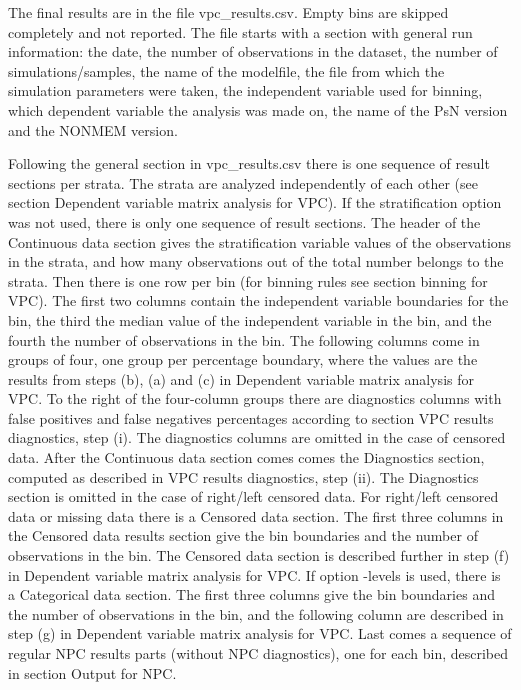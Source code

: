 The final results are in the file vpc\_results.csv. Empty bins are skipped completely and not reported. The file starts with a section with general run information: the date, the number of observations in the dataset, the number of simulations/samples, the name of the modelfile, the file from which the simulation parameters were taken, the independent variable used for binning, which dependent variable the analysis was made on, the name of the PsN version and the NONMEM version. 

Following the general section in vpc\_results.csv there is one sequence of result sections per strata. The strata are analyzed independently of each other (see section Dependent variable matrix analysis for VPC). If the stratification option was not used, there is only one sequence of result sections. The header of the Continuous data section gives the stratification variable values of the observations in the strata, and how many observations out of the total number belongs to the strata. Then there is one row per bin (for binning rules see section binning for VPC). The first two columns contain the independent variable boundaries for the bin, the third the median value of the
independent variable in the bin, 
and the fourth the number of observations in the bin. 
The following columns come in groups of four, one group per percentage boundary, where the values are the results from steps (b), (a) and (c) in Dependent variable matrix analysis for VPC. To the right of the four-column groups there are diagnostics columns with false positives and false negatives percentages according to section VPC results diagnostics, step (i). The diagnostics columns are omitted in the case of censored data. After the Continuous data section comes comes the Diagnostics section, computed as described in VPC results diagnostics, step (ii). The Diagnostics section is omitted in the case of right/left censored data. For right/left censored data or missing data there is a Censored data section. The first three columns in the Censored data results section give the bin boundaries and the number of observations in the bin. The Censored data section is described further in step (f) in Dependent variable matrix analysis for VPC. If option -levels is used, there is a Categorical data section. The first three columns give the bin boundaries and the number of observations in the bin, and the following column are described in step (g) in Dependent variable matrix analysis for VPC. Last comes a sequence of regular NPC results parts (without NPC diagnostics), one for each bin, described in section Output for NPC. 

